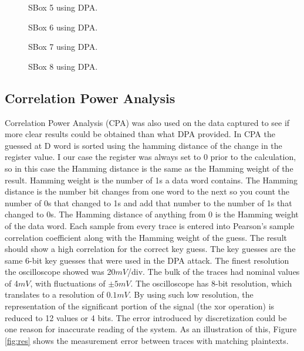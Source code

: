   \begin{figure}[h]
  
  \caption{SBox 5 using DPA.}
	\label{fig:dpa5}
  \end{figure}
  
  \begin{figure}[h]
  
  \caption{SBox 6 using DPA.}
	\label{fig:dpa6}
  \end{figure}
  
  \begin{figure}[h]
  
  \caption{SBox 7 using DPA.}
	\label{fig:dpa7}
  \end{figure}
  
  \begin{figure}[h]
  
  \caption{SBox 8 using DPA.}
	\label{fig:dpa8}
  \end{figure}
		
\subsection{Correlation Power Analysis}
  Correlation Power Analysis (CPA) was also used on the data captured to see if more clear results could be obtained than what DPA provided.  In CPA the guessed at D word is sorted using the hamming distance of the change in the register value.  I our case the register was always set to 0 prior to the calculation, so in this case the Hamming distance is the same as the Hamming weight of the result.  Hamming weight is the number of 1s a data word contains.  The Hamming distance is the number bit changes from one word to the next so you count the number of 0s that changed to 1s and add that number to the number of 1s that changed to 0s.  The Hamming distance of anything from 0 is the Hamming weight of the data word.
  Each sample from every trace is entered into Pearson's sample correlation coefficient along with the Hamming weight of the guess.  The result should show a high correlation for the correct key guess.  The key guesses are the same 6-bit key guesses that were used in the DPA attack.
  The finest resolution the oscilloscope showed was 20$mV$/div. The bulk of the traces had nominal values of 4$mV$, with fluctuations of $\pm 5mV$. The oscilloscope has 8-bit resolution, which translates to a resolution of $0.1mV$. By using such low resolution, the representation of the significant portion of the signal (the xor operation) is reduced to 12 values or 4 bits. The error introduced by discretization could be one reason for inaccurate reading of the system. As an illustration of this, Figure \ref{fig:res} shows the measurement error between traces with matching plaintexts. 


